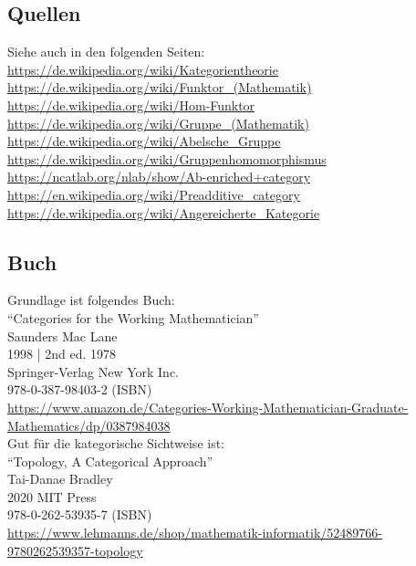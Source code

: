 \documentclass[a4paper]{amsart}
\theoremstyle{definition}
\begin{document}
\subsection*{Quellen}
Siehe auch in den folgenden Seiten:\\
\url{https://de.wikipedia.org/wiki/Kategorientheorie}\\
\url{https://de.wikipedia.org/wiki/Funktor_(Mathematik)}\\
\url{https://de.wikipedia.org/wiki/Hom-Funktor}\\
\url{https://de.wikipedia.org/wiki/Gruppe_(Mathematik)}\\
\url{https://de.wikipedia.org/wiki/Abelsche_Gruppe}\\
\url{https://de.wikipedia.org/wiki/Gruppenhomomorphismus}\\
\url{https://ncatlab.org/nlab/show/Ab-enriched+category}\\
\url{https://en.wikipedia.org/wiki/Preadditive_category}\\
\url{https://de.wikipedia.org/wiki/Angereicherte_Kategorie}

\subsection*{Buch}
Grundlage ist folgendes Buch:\\
"`Categories for the Working Mathematician"'\\
Saunders Mac Lane\\
1998 | 2nd ed. 1978\\
Springer-Verlag New York Inc.\\
978-0-387-98403-2 (ISBN)\\
{\tiny
   \url{https://www.amazon.de/Categories-Working-Mathematician-Graduate-Mathematics/dp/0387984038}}\\

Gut für die kategorische Sichtweise ist:\\
"`Topology, A Categorical Approach"'\\
Tai-Danae Bradley\\
2020 MIT Press\\
978-0-262-53935-7 (ISBN)\\ 
{\tiny
\url{https://www.lehmanns.de/shop/mathematik-informatik/52489766-9780262539357-topology}}\\
\end{document}
